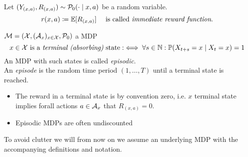 \begin{definition}
Let \((Y_{(x,a)}, R_{(x,a)})\sim \mathcal{P}_0(\cdot\mid x,a) \) be a random variable.
\[r(x,a)\coloneqq \mathbb{E}[R_{(x,a)}] \quad\text{ is called \emph{immediate reward function}.}\]
\end{definition}

\begin{definition}\(\mathcal{M}=(\mathcal{X},(\mathcal{A}_x)_{x\in\mathcal{X}},\mathcal{P}_0)\) a MDP
	\[
		x\in\mathcal{X} \text{ is a \emph{terminal (absorbing)} state} :\iff \forall s\in\mathbb{N}: \mathbb{P}(X_{t+s}=x\mid X_t=x)=1
	\]
	An MDP with such states is called \emph{episodic}.\\
	An \emph{episode} is the random time period \((1,\dots,T)\) until a terminal state is reached.
\end{definition}
\begin{remark}\leavevmode
	\begin{itemize}
		\item The reward in a terminal state is by convention zero, i.e. \(x\) terminal state implies forall actions \(a\in\mathcal{A}_x\) that \(R_{(x,a)}=0\).
		\item Episodic MDPs are often undiscounted
	\end{itemize}	
\end{remark}


To avoid clutter we will from now on we assume an underlying MDP with the accompanying definitions and notation.

